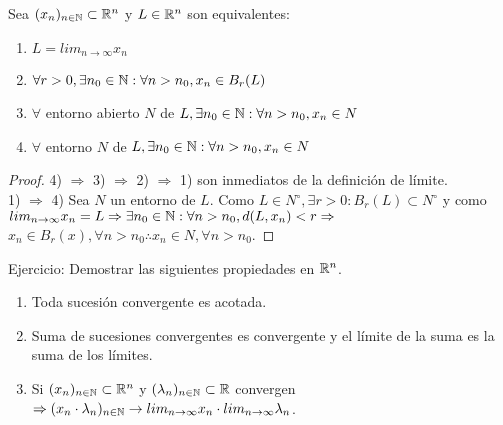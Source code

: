 \begin{prop}
  Sea $(x_n)_{n \in \mathbb{N}} \subset \mathbb{R}^n$ y $L \in \mathbb{R}^n$ son equivalentes:

  \begin{enumerate}
    \item $L = lim_{n \to \infty} x_n$
    \item $\forall r > 0, \exists n_0 \in \mathbb{N} : \forall n > n_0, x_n \in B_r(L)$
    \item $\forall$ entorno abierto $N$ de $L, \exists n_0 \in \mathbb{N} : \forall n > n_0, x_n \in N$
    \item $\forall$ entorno $N$ de $L, \exists n_0 \in \mathbb{N} : \forall n > n_0, x_n \in N$
  \end{enumerate}

  \begin{proof}
    4) $\Rightarrow$ 3) $\Rightarrow$ 2) $\Rightarrow$ 1) son inmediatos de la definición de límite. \\
    1) $\Rightarrow$ 4) Sea $N$ un entorno de $L$. Como $L \in N^{\circ}, \exists r > 0 : B_r(L) \subset N^{\circ}$ y como $lim_{n \to \infty} x_n = L \Rightarrow \exists n_0 \in \mathbb{N} : \forall n > n_0, d(L, x_n) < r \Rightarrow$ \\
    $x_n \in B_r(x), \forall n > n_0 \therefore x_n \in N, \forall n > n_0$.
  \end{proof}
\end{prop}

\begin{prop}
  Ejercicio: Demostrar las siguientes propiedades en $\mathbb{R}^n$.
  \begin{enumerate}
    \item Toda sucesión convergente es acotada.
    \item Suma de sucesiones convergentes es convergente y el límite de la suma es la suma de los límites.
    \item Si $(x_n)_{n \in \mathbb{N}} \subset \mathbb{R}^n$ y $(\lambda_n)_{n \in \mathbb{N}} \subset \mathbb{R}$ convergen $\Rightarrow (x_n \cdot \lambda_n)_{n \in \mathbb{N}} \to lim_{n \to \infty} x_n \cdot lim_{n \to \infty} \lambda_n$.
  \end{enumerate}
\end{prop}

